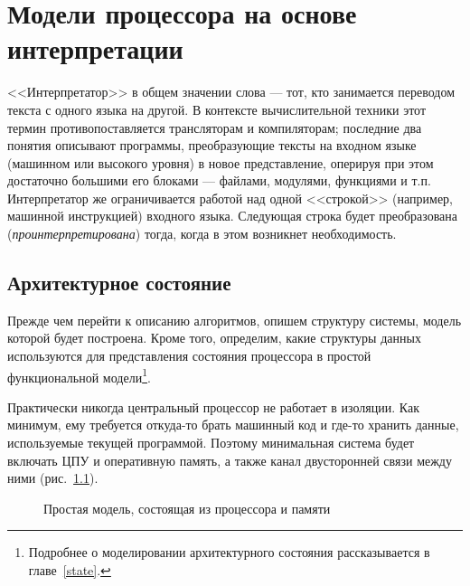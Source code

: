 \chapter{Модели процессора на основе интерпретации}\label{interpretation}



<<Интерпретатор>> в общем значении слова --- тот, кто занимается переводом текста с одного языка на другой. В контексте вычислительной техники этот термин противопоставляется трансляторам и компиляторам; последние два понятия описывают программы, преобразующие тексты на входном языке (машинном или высокого уровня) в новое представление, оперируя при этом достаточно большими его блоками --- файлами, модулями, функциями и т.п. Интерпретатор же ограничивается работой над одной <<строкой>> (например, машинной инструкцией) входного языка. Следующая строка будет преобразована (\emph{проинтерпретирована}) тогда, когда в этом возникнет необходимость.

\section{Архитектурное состояние}

Прежде чем перейти к описанию алгоритмов, опишем структуру системы, модель которой будет построена. Кроме того, определим, какие структуры данных используются для представления состояния процессора в простой функциональной модели\footnote{Подробнее о моделировании архитектурного состояния рассказывается в главе~\ref{state}.}.

Практически никогда центральный процессор не работает в изоляции. Как минимум, ему требуется откуда-то брать машинный код и где-то хранить данные, используемые текущей программой. Поэтому минимальная система будет включать ЦПУ и оперативную память, а также канал двусторонней связи между ними (рис.~\ref{fig:cpu-mem}).

\begin{figure}[htb]
    \centering
    \caption{Простая модель, состоящая из процессора и памяти}
    \label{fig:cpu-mem}
\end{figure}

